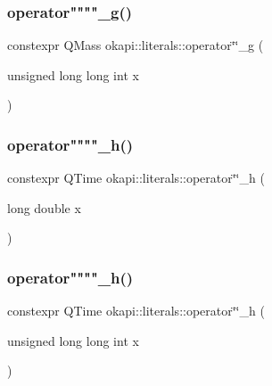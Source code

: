 \mbox{\label{namespaceokapi_1_1literals_a529ed712dda0f43a7ee831cbcf492d1a}} 
\subsubsection{\texorpdfstring{operator""""\_g()}{operator""\_g()}\hspace{0.1cm}{\footnotesize\ttfamily [2/2]}}
{\footnotesize\ttfamily constexpr Q\+Mass okapi\+::literals\+::operator\char`\"{}\char`\"{}\+\_\+g (\begin{DoxyParamCaption}\item[{unsigned long long int}]{x }\end{DoxyParamCaption})}

\mbox{\label{namespaceokapi_1_1literals_a866775de9a45754bd62ea36f9bd05a54}} 
\subsubsection{\texorpdfstring{operator""""\_h()}{operator""\_h()}\hspace{0.1cm}{\footnotesize\ttfamily [1/2]}}
{\footnotesize\ttfamily constexpr Q\+Time okapi\+::literals\+::operator\char`\"{}\char`\"{}\+\_\+h (\begin{DoxyParamCaption}\item[{long double}]{x }\end{DoxyParamCaption})}

\mbox{\label{namespaceokapi_1_1literals_a0d7788ca50c37d059b79a6d8363ea0f9}} 
\subsubsection{\texorpdfstring{operator""""\_h()}{operator""\_h()}\hspace{0.1cm}{\footnotesize\ttfamily [2/2]}}
{\footnotesize\ttfamily constexpr Q\+Time okapi\+::literals\+::operator\char`\"{}\char`\"{}\+\_\+h (\begin{DoxyParamCaption}\item[{unsigned long long int}]{x }\end{DoxyParamCaption})}

